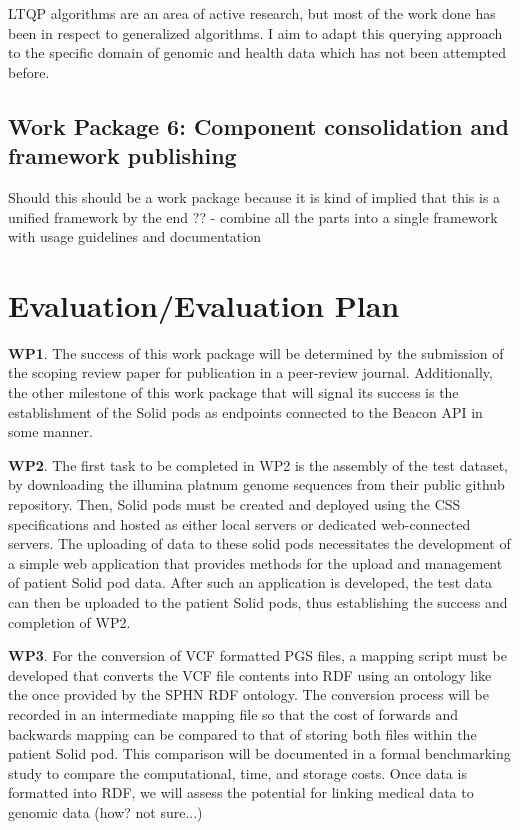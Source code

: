 \documentclass[runningheads]{llncs}
\begin{document}
LTQP algorithms are an area of active research, but most of the work done has been in respect to generalized algorithms.
I aim to adapt this querying approach to the specific domain of genomic and health data which has not been attempted before. 

\subsection{Work Package 6: Component consolidation and framework publishing}

Should this should be a work package because it is kind of implied that this is a unified framework by the end ??
- combine all the parts into a single framework with usage guidelines and documentation


\section{Evaluation/Evaluation Plan}

\textbf{WP1}. 
The success of this work package will be determined by the submission of the scoping review paper for publication in a peer-review journal. 
Additionally, the other milestone of this work package that will signal its success is the establishment of the Solid pods as endpoints connected to the Beacon API in some manner. 

\textbf{WP2}.
The first task to be completed in WP2 is the assembly of the test dataset, by downloading the illumina platnum genome sequences from their public github repository.
Then, Solid pods must be created and deployed using the CSS specifications and hosted as either local servers or dedicated web-connected servers.
The uploading of data to these solid pods necessitates the development of a simple web application that provides methods for the upload and management of patient Solid pod data. 
After such an application is developed, the test data can then be uploaded to the patient Solid pods, thus establishing the success and completion of WP2.

\textbf{WP3}.
For the conversion of VCF formatted PGS files, a mapping script must be developed that converts the VCF file contents into RDF using an ontology like the once provided by the SPHN RDF ontology. 
The conversion process will be recorded in an intermediate mapping file so that the cost of forwards and backwards mapping can be compared to that of storing both files within the patient Solid pod. 
This comparison will be documented in a formal benchmarking study to compare the computational, time, and storage costs.
Once data is formatted into RDF, we will assess the potential for linking medical data to genomic data (how? not sure...)
\end{document}

